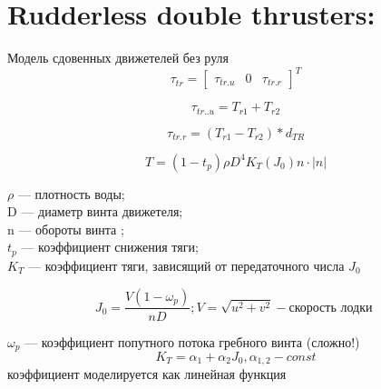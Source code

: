 \newpage
\section*{Rudderless double thrusters:}

Модель сдовенных движетелей без руля \\

\begin{equation*}
    \tau_{tr} = \begin{bmatrix} \tau_{tr.u} & 0 & \tau_{tr.r}  \end{bmatrix}^T
\end{equation*}

\begin{equation*}
    \tau_{tr..u} = T_{r1} + T_{r2}
\end{equation*}

\begin{equation*}
    \tau_{tr.r} = (T_{r1} - T_{r2})*d_{TR}
\end{equation*}

\noindent{\rule{4cm}{0.4pt}}

\begin{equation}\label{1}
    T = (1 - t_p)\rho D^4K_T(J_0)n\cdot|n|  
\end{equation}

${\rho}$ --- плотность воды; \\

D --- диаметр винта движетеля; \\

n --- обороты винта ; \\

${t_p}$ --- коэффициент снижения тяги; \\

${K_T}$ --- коэффициент тяги, зависящий от передаточного числа ${J_0}$

\noindent{\rule{4cm}{0.4pt}}

\begin{equation}\label{2}
    J_0 = \frac{V(1 - \omega_p)}{nD}; V = \sqrt{u^2 + v^2} - \textit{скорость лодки } 
\end{equation}

${\omega_p}$ --- коэффициент попутного потока гребного винта (сложно!) \\

\begin{equation}\label{3}
    K_T = \alpha_1 + \alpha_2J_0,  \alpha_{1, 2} -  \textit {const} 
\end{equation}
коэффициент моделируется как линейная функция \\

